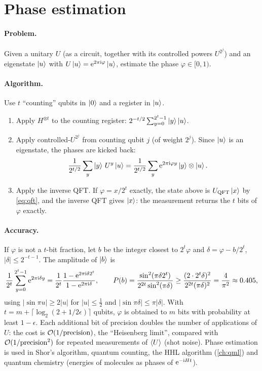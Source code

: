 \section{Phase estimation}
\paragraph{Problem.} Given a unitary $U$ (as a circuit, together with its controlled powers $U^{2^j}$) and an eigenstate $\left|u\right\rangle$ with $U\left|u\right\rangle=\mathrm e^{2\pi\mathrm i\varphi}\left|u\right\rangle$, estimate the phase $\varphi\in[0,1)$.

\paragraph{Algorithm.} Use $t$ ``counting'' qubits in $\left|0\right\rangle$ and a register in $\left|u\right\rangle$.
\begin{enumerate}
  \item Apply $H^{\otimes t}$ to the counting register: $2^{-t/2}\sum_{y=0}^{2^t-1}\left|y\right\rangle\left|u\right\rangle$.
  \item Apply controlled-$U^{2^j}$ from counting qubit $j$ (of weight $2^j$). Since $\left|u\right\rangle$ is an eigenstate, the phases are kicked back:
  \begin{equation}
    \frac1{2^{t/2}}\sum_y\left|y\right\rangle\,U^y\left|u\right\rangle=\frac1{2^{t/2}}\sum_y\mathrm e^{2\pi\mathrm i\varphi y}\left|y\right\rangle\otimes\left|u\right\rangle .
  \end{equation}
  \item Apply the inverse QFT. If $\varphi=x/2^t$ exactly, the state above is $U_{\rm QFT}\left|x\right\rangle$ by \cref{eq:qft}, and the inverse QFT gives $\left|x\right\rangle$: the measurement returns the $t$ bits of $\varphi$ exactly.
\end{enumerate}
\paragraph{Accuracy.} If $\varphi$ is not a $t$-bit fraction, let $b$ be the integer closest to $2^t\varphi$ and $\delta=\varphi-b/2^t$, $|\delta|\le2^{-t-1}$. The amplitude of $\left|b\right\rangle$ is
\begin{equation}
  \frac1{2^t}\sum_{y=0}^{2^t-1}\mathrm e^{2\pi\mathrm i\delta y}=\frac1{2^t}\frac{1-\mathrm e^{2\pi\mathrm i\delta2^t}}{1-\mathrm e^{2\pi\mathrm i\delta}},\qquad
  P(b)=\frac{\sin^2(\pi\delta2^t)}{2^{2t}\sin^2(\pi\delta)}\ge\frac{(2\cdot2^t\delta)^2}{2^{2t}(\pi\delta)^2}=\frac4{\pi^2}\approx0.405,
\end{equation}
using $|\sin\pi u|\ge2|u|$ for $|u|\le\frac12$ and $|\sin\pi\delta|\le\pi|\delta|$. With $t=m+\lceil\log_2(2+1/2\epsilon)\rceil$ qubits, $\varphi$ is obtained to $m$ bits with probability at least $1-\epsilon$.
Each additional bit of precision doubles the number of applications of $U$: the cost is $\mathcal O(1/\text{precision})$, the ``Heisenberg limit'', compared with $\mathcal O(1/\text{precision}^2)$ for repeated
measurements of $\left\langle U\right\rangle$ (shot noise). Phase estimation is used in Shor's algorithm, quantum counting, the HHL algorithm (\cref{ch:qml}) and quantum chemistry (energies of molecules as phases of $\mathrm e^{-\mathrm i Ht}$).

